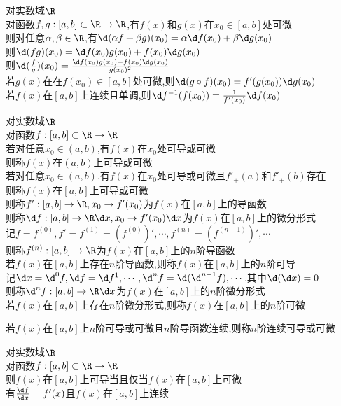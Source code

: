 \begin{dingli}
对实数域$\R$\\
对函数$f,g:[a,b]\subset \R \to \R$,有$f(x)$和$g(x)$在$x_0\in [a,b]$处可微\\
则对任意$\alpha,\beta\in\R$,有$\d(\alpha f+\beta g)(x_0)=\alpha \d f(x_0)+\beta \d g(x_0)$\\
则$\d(fg)(x_0)=\d f(x_0)g(x_0)+f(x_0)\d g(x_0)$\\
则$\d(\frac{f}{g})(x_0)=\frac{\d f(x_0)g(x_0)-f(x_0)\d g(x_0)}{g(x_0)^2}$\\
若$g(x)$在在$f(x_0)\in [a,b]$处可微,则$\d (g\circ f)(x_0)=f'(g(x_0))\d g(x_0)$\\
若$f(x)$在$[a,b]$上连续且单调,则$\d f^{-1}(f(x_0))=\frac{1}{f'(x_0)}\d f(x_0)$
\end{dingli}

\begin{dingyi}
对实数域$\R$\\
对函数$f:[a,b]\subset \R \to \R$\\
若对任意$x_0\in (a,b)$,有$f(x)$在$x_0$处可导或可微\\
则称$f(x)$在$(a,b)$上可导或可微\\
若对任意$x_0\in (a,b)$,有$f(x)$在$x_0$处可导或可微且$f'_{+}(a)$和$f'_{+}(b)$存在\\
则称$f(x)$在$[a,b]$上可导或可微\\
则称$f':[a,b]\to \R,x_0\to f'(x_0)$为$f(x)$在$[a,b]$上的导函数\\
则称$\d f:[a,b]\to \R\d x,x_0\to f'(x_0)\d x$为$f(x)$在$[a,b]$上的微分形式\\
记$f=f^{(0)},f'=f^{(1)}=(f^{(0)})',\cdots,f^{(n)}=(f^{(n-1)})',\cdots$\\
则称$f^{(n)}:[a,b]\to \R$为$f(x)$在$[a,b]$上的$n$阶导函数\\
若$f(x)$在$[a,b]$上存在$n$阶导函数,则称$f(x)$在$[a,b]$上的$n$阶可导\\
记$\d x=\d^{0} f,\d f=\d f^{1},\cdots,\d^{n}f=\d(\d^{n-1}f),\cdots$,其中$\d(\d x)=0$\\
则称$\d^{n}f:[a,b]\to \R\d x$为$f(x)$在$[a,b]$上的$n$阶微分形式\\
若$f(x)$在$[a,b]$上存在$n$阶微分形式,则称$f(x)$在$[a,b]$上的$n$阶可微
\end{dingyi}

\begin{zhu}
若$f(x)$在$[a,b]$上$n$阶可导或可微且$n$阶导函数连续,则称$n$阶连续可导或可微
\end{zhu}

\begin{dingli}
对实数域$\R$\\
对函数$f:[a,b]\subset \R \to \R$\\
则$f(x)$在$[a,b]$上可导当且仅当$f(x)$在$[a,b]$上可微\\
有$\frac{\d f}{\d x}=f'(x)$且$f(x)$在$[a,b]$上连续
\end{dingli}

